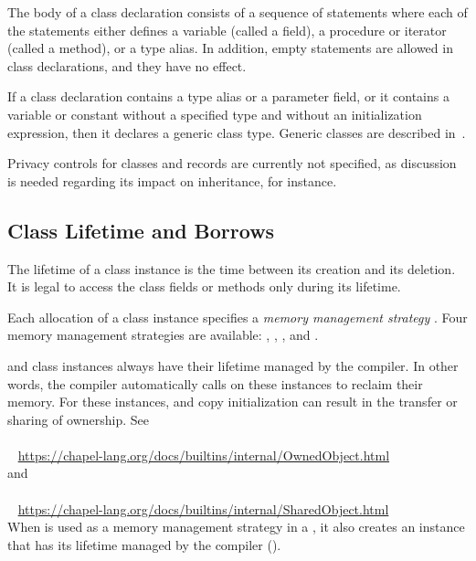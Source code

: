 The body of a class declaration consists of a sequence of statements
where each of the statements either defines a variable (called a
field), a procedure or iterator (called a method), or a type alias.  In addition, empty
statements are allowed in class declarations, and they have no effect.

If a class declaration contains a type alias or a parameter field, or it contains a variable or
constant without a specified type and without an initialization
expression, then it declares a generic class type.  Generic classes are described
in~.

\begin{future}
Privacy controls for classes and records are currently not specified,
as discussion is needed regarding its impact on inheritance, for
instance.
\end{future}

\subsection{Class Lifetime and Borrows}
\label{Class_Lifetime_and_Borrows}

The lifetime of a class instance is the time between its creation and its
deletion. It is legal to access the class fields or methods only during
its lifetime.

Each allocation of a class instance specifies a \emph{memory management
strategy} . Four memory management strategies are available:
, , , and .

 and  class instances always have their lifetime
managed by the compiler. In other words, the compiler automatically
calls  on these instances to reclaim their memory. For these
instances, \chpl{=} and copy initialization can result in the transfer or
sharing of ownership. See
\\ %
\mbox{$$ $$ $$ $$ $$} %
\url{https://chapel-lang.org/docs/builtins/internal/OwnedObject.html}
\\
and
\\ %
\mbox{$$ $$ $$ $$ $$} %
\url{https://chapel-lang.org/docs/builtins/internal/SharedObject.html}
\\

When  is used as a memory management strategy in a
, it also creates an instance that has its lifetime
managed by the compiler ().

